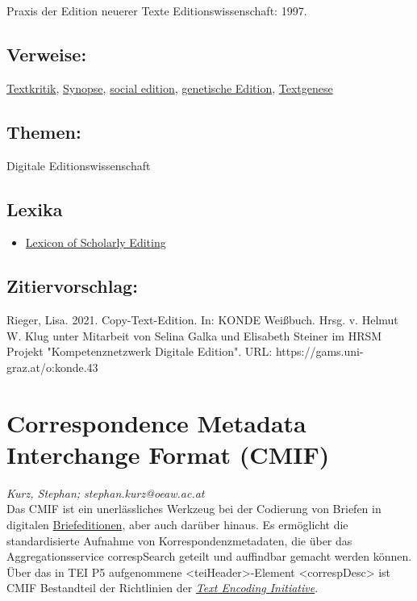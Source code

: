 \documentclass{article}
\begin{document}
\begin{itemize}
                              Praxis der Edition neuerer Texte Editionswissenschaft: 1997.\end{itemize}\subsection*{Verweise:}\href{https://gams.uni-graz.at/o:konde.192}{Textkritik}, \href{https://gams.uni-graz.at/o:konde.174}{Synopse}, \href{https://gams.uni-graz.at/o:konde.169}{social edition}, \href{https://gams.uni-graz.at/o:konde.90}{genetische Edition}, \href{https://gams.uni-graz.at/o:konde.28}{Textgenese}\subsection*{Themen:}Digitale Editionswissenschaft\subsection*{Lexika}\begin{itemize}\item \href{https://lexiconse.uantwerpen.be/index.php/lexicon/copy-text/}{Lexicon of Scholarly Editing}\end{itemize}\subsection*{Zitiervorschlag:}Rieger, Lisa. 2021. Copy-Text-Edition. In: KONDE Weißbuch. Hrsg. v. Helmut W. Klug unter Mitarbeit von Selina Galka und Elisabeth Steiner im HRSM Projekt "Kompetenznetzwerk Digitale Edition". URL: https://gams.uni-graz.at/o:konde.43\newpage\section*{Correspondence Metadata Interchange Format (CMIF)} \emph{Kurz, Stephan; stephan.kurz@oeaw.ac.at }\\
        
    Das CMIF ist ein unerlässliches Werkzeug bei der Codierung von Briefen in
                  digitalen \href{http://gams.uni-graz.at/o:konde.39}{Briefeditionen}, aber
                  auch darüber hinaus. Es ermöglicht die standardisierte Aufnahme von
                  Korrespondenzmetadaten, die über das Aggregationsservice correspSearch geteilt und auffindbar gemacht werden können. \\
            
        Über das in TEI P5 aufgenommene <teiHeader>-Element <correspDesc>
                   ist CMIF Bestandteil der Richtlinien der \emph{\href{http://gams.uni-graz.at/o:konde.178}{Text Encoding Initiative}}.\\
            
\end{document}
